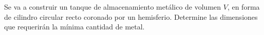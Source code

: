 \item Se va a construir un tanque de almacenamiento metálico de volumen $V$, en forma de cilindro circular recto coronado por un hemisferio. Determine las dimensiones que requerirán la mínima cantidad de metal.
